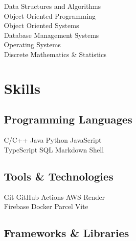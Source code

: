 \documentclass[]{deedy-resume-openfont}
\begin{document}
\begin{minipage}[t]{0.33\textwidth}
Data Structures and Algorithms \\
Object Oriented Programming \\
Object Oriented Systems \\
Database Management Systems \\
Operating Systems \\
Discrete Mathematics \& Statistics

\sectionsep



\section{Skills}
\sectionsep

\subsection{Programming Languages}
C/C++ \textbullet{} Java \textbullet{} Python \textbullet{} JavaScript \\
TypeScript \textbullet{} SQL \textbullet{} Markdown \textbullet{}Shell

\sectionsep

\subsection{Tools \& Technologies}
Git \textbullet{} GitHub Actions \textbullet{} AWS \textbullet{} Render  \\ 
Firebase \textbullet{}  Docker   \textbullet{} Parcel \textbullet{} Vite 

\sectionsep

\subsection{Frameworks \& Libraries}


\end{minipage}
\end{document}
